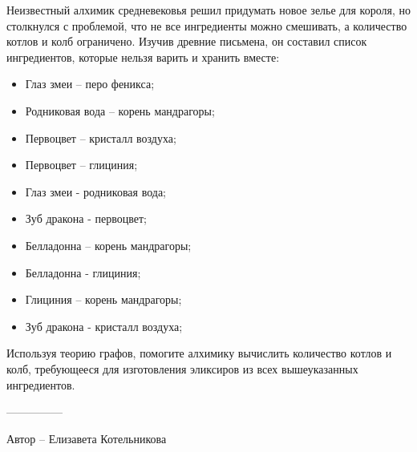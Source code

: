 \question
Неизвестный алхимик средневековья решил придумать новое зелье для короля, но столкнулся с проблемой, что не все ингредиенты можно смешивать, а количество котлов и колб ограничено. Изучив древние письмена, он составил список ингредиентов, которые нельзя варить и хранить вместе:

\begin{itemize}
\item Глаз змеи – перо феникса;

\item Родниковая вода – корень мандрагоры;

\item Первоцвет – кристалл воздуха;

\item Первоцвет – глициния;

\item Глаз змеи - родниковая вода;

\item Зуб дракона - первоцвет;

\item Белладонна – корень мандрагоры;

\item Белладонна - глициния;

\item Глициния – корень мандрагоры;

\item Зуб дракона - кристалл воздуха;
\end{itemize}

Используя теорию графов, помогите алхимику вычислить количество котлов и колб, требующееся для изготовления эликсиров из всех вышеуказанных ингредиентов. 

---------------

Автор -- Елизавета Котельникова